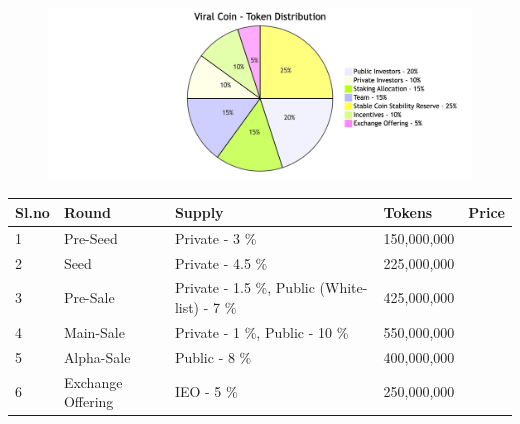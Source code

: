 \documentclass[10pt]{article}
\begin{document}
\vspace{5mm}

\begin{figure}[H]
\begin{center}
\includegraphics[width=\textwidth]{token-distribution}
\end{center}
\end{figure}


\begin{center}
\begin{table}[!ht]
    \centering
    \begin{tabular}{|l|l|l|l|l|}
    \hline
        \textbf{Sl.no} & \textbf{Round} & \textbf{Supply} & \textbf{Tokens} & \textbf{Price} \\ \hline
        1 & Pre-Seed & Private - 3 \% & 150,000,000 & ~ \\ \hline
        2 & Seed & Private - 4.5 \% & 225,000,000 & ~ \\ \hline
        3 & Pre-Sale & Private - 1.5 \%,  Public (White-list) - 7 \%  & 425,000,000 & ~ \\ \hline
        4 & Main-Sale & Private -  1 \%, Public - 10 \% & 550,000,000 & ~ \\ \hline
        5 & Alpha-Sale & Public - 8 \% & 400,000,000 & ~ \\ \hline
        6 & Exchange Offering & IEO - 5 \% & 250,000,000 & ~ \\ \hline
    \end{tabular}
\end{table}
\end{center}

\end{document}
